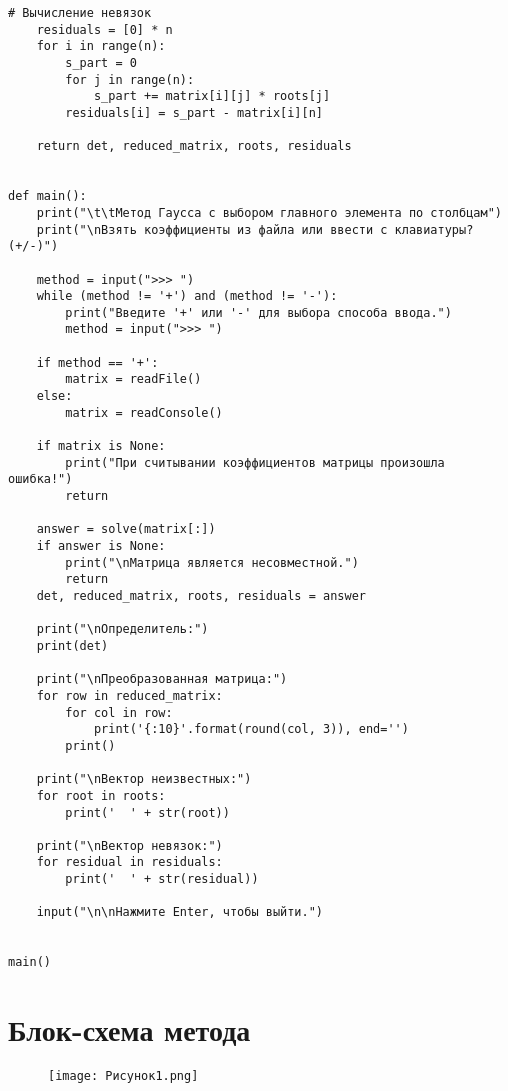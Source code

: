 \documentclass[12pt]{report}
\begin{document}
\begin{lstlisting}[style=pythonstyle]
    # Вычисление невязок
    residuals = [0] * n
    for i in range(n):
        s_part = 0
        for j in range(n):
            s_part += matrix[i][j] * roots[j]
        residuals[i] = s_part - matrix[i][n]

    return det, reduced_matrix, roots, residuals


def main():
    print("\t\tМетод Гаусса с выбором главного элемента по столбцам")
    print("\nВзять коэффициенты из файла или ввести с клавиатуры? (+/-)")

    method = input(">>> ")
    while (method != '+') and (method != '-'):
        print("Введите '+' или '-' для выбора способа ввода.")
        method = input(">>> ")

    if method == '+':
        matrix = readFile()
    else:
        matrix = readConsole()

    if matrix is None:
        print("При считывании коэффициентов матрицы произошла ошибка!")
        return

    answer = solve(matrix[:])
    if answer is None:
        print("\nМатрица является несовместной.")
        return
    det, reduced_matrix, roots, residuals = answer

    print("\nОпределитель:")
    print(det)

    print("\nПреобразованная матрица:")
    for row in reduced_matrix:
        for col in row:
            print('{:10}'.format(round(col, 3)), end='')
        print()

    print("\nВектор неизвестных:")
    for root in roots:
        print('  ' + str(root))

    print("\nВектор невязок:")
    for residual in residuals:
        print('  ' + str(residual))

    input("\n\nНажмите Enter, чтобы выйти.")


main()

\end{lstlisting}
\newpage

\section*{Блок-схема метода}

\begin{figure}[h]
        \centering
        \texttt{[image: Рисунок1.png]}
\end{figure}
\newpage

\end{document}
